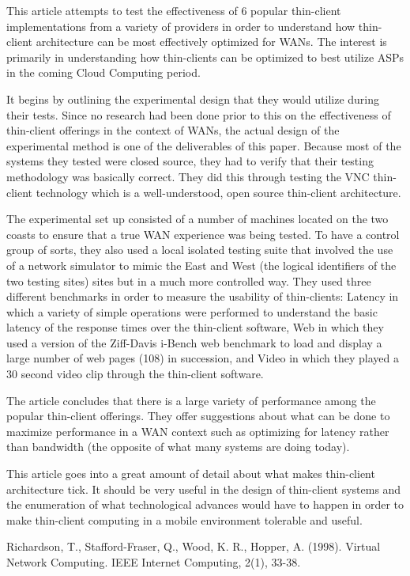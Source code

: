 \documentclass[12pt,oneside,letterpaper,titlepage]{article}
\begin{document}
This article attempts to test the effectiveness of 6 popular thin-client
implementations from a variety of providers in order to understand how
thin-client architecture can be most effectively optimized for WANs.  The
interest is primarily in understanding how thin-clients can be optimized to best
utilize ASPs in the coming Cloud Computing period.

It begins by outlining the experimental design that they would utilize during
their tests.  Since no research had been done prior to this on the effectiveness
of thin-client offerings in the context of WANs, the actual design of the
experimental method is one of the deliverables of this paper.  Because most of
the systems they tested were closed source, they had to verify that their
testing methodology was basically correct.  They did this through testing the
VNC thin-client technology which is a well-understood, open source thin-client
architecture.

The experimental set up consisted of a number of machines located on the two
coasts to ensure that a true WAN experience was being tested.  To have a control
group of sorts, they also used a local isolated testing suite that involved the
use of a network simulator to mimic the East and West (the logical identifiers
of the two testing sites) sites but in a much more controlled way.  They used
three different benchmarks in order to measure the usability of thin-clients:
Latency in which a variety of simple operations were performed to understand the
basic latency of the response times over the thin-client software, Web in which
they used a version of the Ziff-Davis i-Bench web benchmark to load and display
a large number of web pages (108) in succession, and Video in which they played
a 30 second video clip through the thin-client software.

The article concludes that there is a large variety of performance among the
popular thin-client offerings.  They offer suggestions about what can be done to
maximize performance in a WAN context such as optimizing for latency rather than
bandwidth (the opposite of what many systems are doing today).

This article goes into a great amount of detail about what makes thin-client
architecture tick.  It should be very useful in the design of thin-client
systems and the enumeration of what technological advances would have to happen
in order to make thin-client computing in a mobile environment tolerable and
useful.

Richardson, T., Stafford-Fraser, Q., Wood, K. R., Hopper, A. (1998). Virtual Network Computing. IEEE Internet Computing, 2(1), 33-38.
\end{document}
